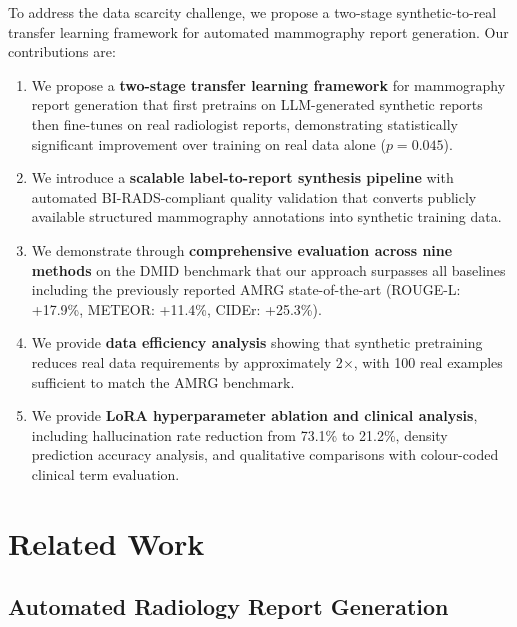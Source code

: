 \documentclass{wlscirep}
\begin{document}
To address the data scarcity challenge, we propose a two-stage synthetic-to-real transfer learning framework for automated mammography report generation. Our contributions are:

\begin{enumerate}
    \item We propose a \textbf{two-stage transfer learning framework} for mammography report generation that first pretrains on LLM-generated synthetic reports then fine-tunes on real radiologist reports, demonstrating statistically significant improvement over training on real data alone ($p=0.045$).
    \item We introduce a \textbf{scalable label-to-report synthesis pipeline} with automated BI-RADS-compliant quality validation that converts publicly available structured mammography annotations into synthetic training data.
    \item We demonstrate through \textbf{comprehensive evaluation across nine methods} on the DMID benchmark that our approach surpasses all baselines including the previously reported AMRG state-of-the-art (ROUGE-L: +17.9\%, METEOR: +11.4\%, CIDEr: +25.3\%).
    \item We provide \textbf{data efficiency analysis} showing that synthetic pretraining reduces real data requirements by approximately 2$\times$, with 100 real examples sufficient to match the AMRG benchmark.
    \item We provide \textbf{LoRA hyperparameter ablation and clinical analysis}, including hallucination rate reduction from 73.1\% to 21.2\%, density prediction accuracy analysis, and qualitative comparisons with colour-coded clinical term evaluation.
\end{enumerate}

\section*{Related Work}

\subsection*{Automated Radiology Report Generation}
\end{document}

